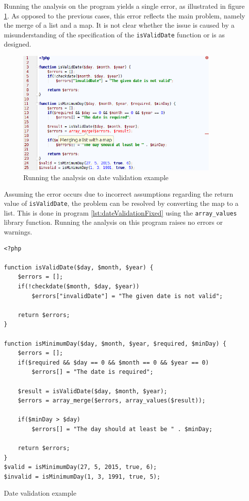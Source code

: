 Running the analysis on the program yields a single error, as illustrated in figure \ref{fig:dateScreenshot}. As opposed to the previous cases, this error reflects the main problem, namely the merge of a list and a map. It is not clear whether the issue is caused by a misunderstanding of the specification of the \texttt{isValidDate} function or is as designed.

\begin{figure}
\centering
\includegraphics[width=0.9\textwidth]{chapters/caseStudy/screens/date}
\caption{Running the analysis on date validation example}
\label{fig:dateScreenshot}
\end{figure}


Assuming the error occurs due to incorrect assumptions regarding the return value of \texttt{isValidDate}, the problem can be resolved by converting the map to a list. This is done in program \ref{lst:dateValidationFixed} using the \texttt{array\_values} library function. Running the analysis on this program raises no errors or warnings.


\begin{program}
\begin{lstlisting}
<?php

function isValidDate($day, $month, $year) {
    $errors = [];
    if(!checkdate($month, $day, $year))
        $errors["invalidDate"] = "The given date is not valid";

    return $errors;
}

function isMinimumDay($day, $month, $year, $required, $minDay) {
    $errors = [];
    if($required && $day == 0 && $month == 0 && $year == 0)
        $errors[] = "The date is required";

    $result = isValidDate($day, $month, $year);
    $errors = array_merge($errors, array_values($result));

    if($minDay > $day)
        $errors[] = "The day should at least be " . $minDay;

    return $errors;
}
$valid = isMinimumDay(27, 5, 2015, true, 6);
$invalid = isMinimumDay(1, 3, 1991, true, 5);
\end{lstlisting}
\caption{Date validation example}
\label{lst:dateValidationFixed}
\end{program}